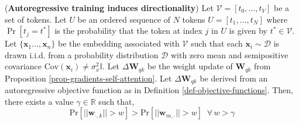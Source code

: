 \begin{theorem}
\label{theo-gradient-directionality}
%
(\textbf{Autoregressive training induces directionality})
%
Let $\mathcal{V} = [t_0, \dots, t_V]$ be a set of tokens.
%
Let $U$ be an ordered sequence of $N$ tokens $U = [t_1, \dots, t_N]$ where $\Pr[t_j = t^*]$ is the probability that the token at index $j$ in $U$ is given by $t^* \in \mathcal{V}$.
%
Let $\{\bm{x}_1 \dots, \bm{x}_n\}$ be the embedding associated with $\mathcal{V}$ such that each $\bm{x}_i \sim \mathcal{D}$ is drawn i.i.d. from a probability distribution $\mathcal{D}$ with zero mean and semipositive covariance $\text{Cov}(\bm{x}_i)  \neq \sigma_x^2\mathbb{I}$.
%
Let $\Delta \bm{W}_{qk}$ be the weight update of $\bm{W}_{qk}$ from Proposition \ref{prop-gradients-self-attention}.
%
Let $\Delta \bm{W}_{qk}$ be derived from an autoregressive objective function as in Definition \ref{def-objective-functions}.
%
Then, there exists a value $\gamma \in \mathbb{R}$ such that,
%
\begin{equation}
    \text{Pr}[||\bm{w}_{\cdot, k}|| > w] > \text{Pr}[|| \bm{w}_{m, \cdot}|| > w] \,\,\ \forall \,w > \gamma
\end{equation}
%
%
\end{theorem}